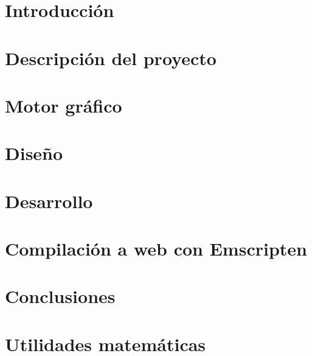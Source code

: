 \documentclass{report}
\begin{document}
\chapter{Introducción}


\cleardoublepage
\chapter{Descripción del proyecto}


\cleardoublepage
\chapter{Motor gráfico}


\cleardoublepage
\chapter{Diseño}


\cleardoublepage
\chapter{Desarrollo}


\cleardoublepage
\chapter{Compilación a web con Emscripten}


\cleardoublepage
\chapter{Conclusiones}


\cleardoublepage
\appendix
\chapter{Utilidades matemáticas}


%
%
\printbibliography
\end{document}

